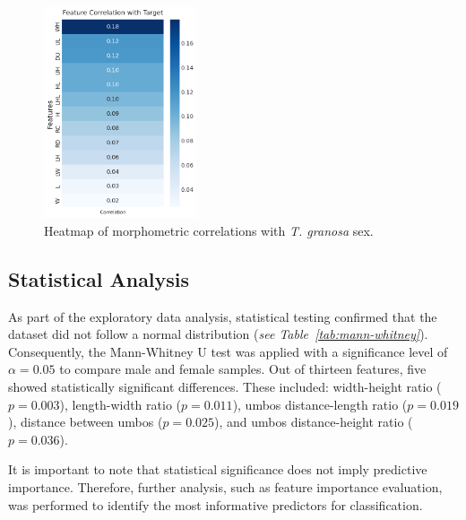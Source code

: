 \vspace{0.5cm}
\begin{figure}[!htbp]
	\centering
	\includegraphics[width=0.4\textwidth]{figures/heatmap.png}
	\caption{Heatmap of morphometric correlations with \textit{T. granosa} sex.}
	\label{fig:heatmap}
\end{figure}

\newpage
\subsection{Statistical Analysis}

As part of the exploratory data analysis, statistical testing confirmed that the dataset did not follow a normal distribution (\textit{see Table~\ref{tab:mann-whitney}}). Consequently, the Mann-Whitney U test was applied with a significance level of $\alpha = 0.05$ to compare male and female samples. Out of thirteen features, five showed statistically significant differences. These included: width-height ratio ($p = 0.003$), length-width ratio ($p = 0.011$), umbos distance-length ratio ($p = 0.019$), distance between umbos ($p = 0.025$), and umbos distance-height ratio ($p = 0.036$). 

It is important to note that statistical significance does not imply predictive importance. Therefore, further analysis, such as feature importance evaluation, was performed to identify the most informative predictors for classification.

